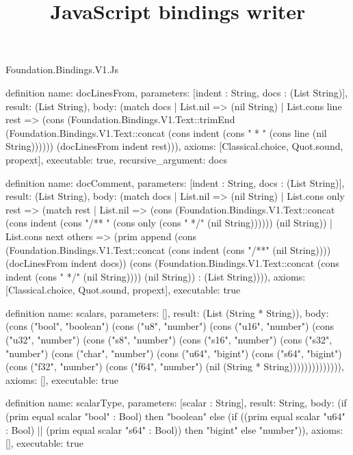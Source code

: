 \begin{lexlean}{Foundation.Bindings.V1.Js}
\title{JavaScript bindings writer}
\begin{semanticmodule}
definition{
  name: docLinesFrom,
  parameters: [indent : String, docs : (List String)],
  result: (List String),
  body: (match docs
    | List.nil => (nil String)
    | List.cons line rest => (cons (Foundation.Bindings.V1.Text::trimEnd (Foundation.Bindings.V1.Text::concat (cons indent (cons " * " (cons line (nil String)))))) (docLinesFrom indent rest))),
  axioms: [Classical.choice, Quot.sound, propext],
  executable: true,
  recursive_argument: docs
}

definition{
  name: docComment,
  parameters: [indent : String, docs : (List String)],
  result: (List String),
  body: (match docs
    | List.nil => (nil String)
    | List.cons only rest => (match rest
      | List.nil => (cons (Foundation.Bindings.V1.Text::concat (cons indent (cons "/** " (cons only (cons " */" (nil String)))))) (nil String))
      | List.cons next others => (prim append (cons (Foundation.Bindings.V1.Text::concat (cons indent (cons "/**" (nil String)))) (docLinesFrom indent docs)) (cons (Foundation.Bindings.V1.Text::concat (cons indent (cons " */" (nil String)))) (nil String)) : (List String)))),
  axioms: [Classical.choice, Quot.sound, propext],
  executable: true
}

definition{
  name: scalars,
  parameters: [],
  result: (List (String * String)),
  body: (cons ("bool", "boolean") (cons ("u8", "number") (cons ("u16", "number") (cons ("u32", "number") (cons ("s8", "number") (cons ("s16", "number") (cons ("s32", "number") (cons ("char", "number") (cons ("u64", "bigint") (cons ("s64", "bigint") (cons ("f32", "number") (cons ("f64", "number") (nil (String * String)))))))))))))),
  axioms: [],
  executable: true
}

definition{
  name: scalarType,
  parameters: [scalar : String],
  result: String,
  body: (if (prim equal scalar "bool" : Bool) then "boolean" else (if ((prim equal scalar "u64" : Bool) || (prim equal scalar "s64" : Bool)) then "bigint" else "number")),
  axioms: [],
  executable: true
}


\end{semanticmodule}
\end{lexlean}
